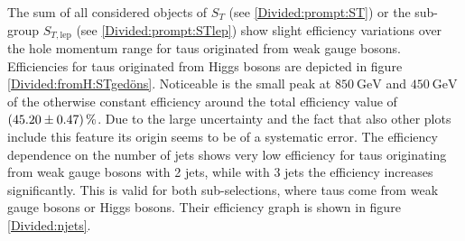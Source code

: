 %
The sum of all considered objects of $S_T$ (see \ref{Divided:prompt:ST}) or the sub-group $S_{T,\text{lep}}$ (see \ref{Divided:prompt:STlep}) show slight efficiency variations over the hole momentum range for taus originated from weak gauge bosons. Efficiencies for taus originated from Higgs bosons are depicted in figure \ref{Divided:fromH:STgedöns}. Noticeable is the small peak at $\SI{850}{\giga\electronvolt}$ and $\SI{450}{\giga\electronvolt}$ of the otherwise constant efficiency around the total efficiency value of $\SI{45.20\pm 0.47}{\percent}$. Due to the large uncertainty and the fact that also other plots include this feature its origin seems to be of a systematic error.\newline  
The efficiency dependence on the number of jets shows very low efficiency for taus originating from weak gauge bosons with 2 jets, while with 3 jets the efficiency increases significantly. This is valid for both sub-selections, where taus come from weak gauge bosons or Higgs bosons. Their efficiency graph is shown in figure \ref{Divided:njets}.\newline
%
